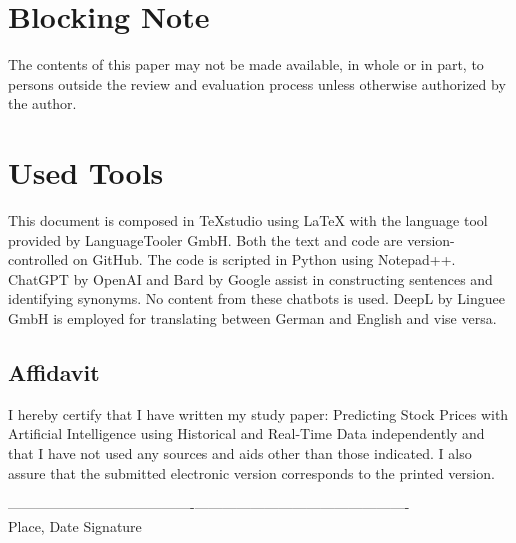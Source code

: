 \newpage
{}
\section*{Blocking Note}
The contents of this paper may not be made available, in whole or in part, to persons outside the review and evaluation process unless otherwise authorized by the author.

\section*{Used Tools}
This document is composed in \TeX{}studio using \LaTeX{} with the language tool provided by LanguageTooler GmbH. Both the text and code are version-controlled on GitHub. The code is scripted in Python using Notepad++. ChatGPT by OpenAI and Bard by Google assist in constructing sentences and identifying synonyms. No content from these chatbots is used. DeepL by Linguee GmbH is employed for translating between German and English and vise versa.


\clearpage
{}
\begin{blackframebox}
	\section*{Affidavit}
	I hereby certify that I have written my study paper: \grqq Predicting Stock Prices with Artificial Intelligence using Historical and Real-Time Data\grqq{} independently and that I have not used any sources and aids other than those indicated. I also assure that the submitted electronic version corresponds to the printed version.
	
	\vspace{4\baselineskip}
	----------------------------------------\hfill----------------------------------------------\\
	Place, Date \hfill Signature
\end{blackframebox}
\clearpage